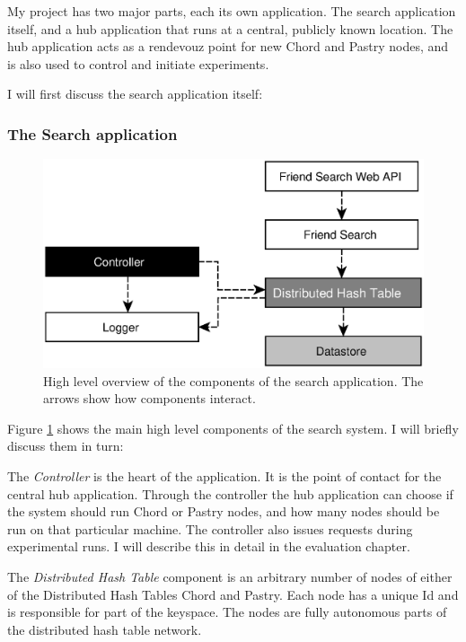My project has two major parts, each its own application. The search application itself, and a hub application that runs at a central, publicly known location. The hub application acts as a rendevouz point for new Chord and Pastry nodes, and is also used to control and initiate experiments.

\mbox{}

I will first discuss the search application itself:


\subsubsection{The Search application}

\begin{figure}[!htb]
\begin{center}
	\includegraphics[width=0.9\linewidth]{illustrations/ComponentOverview.eps}
\caption{High level overview of the components of the search application. The arrows show how components interact.}
\label{figComponents}
\end{center}
\end{figure}

Figure \ref{figComponents} shows the main high level components of the search system. I will briefly discuss them in turn:

The \emph{Controller} is the heart of the application. It is the point of contact for the central hub application. Through the controller the hub application can choose if the system should run Chord or Pastry nodes, and how many nodes should be run on that particular machine. The controller also issues requests during experimental runs. I will describe this in detail in the evaluation chapter.

The \emph{Distributed Hash Table} component is an arbitrary number of nodes of either of the Distributed Hash Tables Chord and Pastry. Each node has a unique Id and is responsible for part of the keyspace. The nodes are fully autonomous parts of the distributed hash table network.

